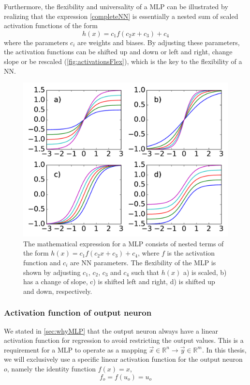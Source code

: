 \documentclass[twoside,english]{uiofysmaster}
\begin{document}
Furthermore, the flexibility and universality of a MLP can be illustrated by realizing that 
the expression \eqref{completeNN} is essentially a nested sum of scaled activation functions of the form
\begin{equation}
 h(x) = c_1 f(c_2 x + c_3) + c_4
\end{equation}
where the parameters $c_i$ are weights and biases. By adjusting these parameters, the activation functions
can be shifted up and down or left and right, change slope or be rescaled (\autoref{fig:activationsFlex}), 
which is the key to the flexibility of a NN. 
\begin{figure}
\begin{center}
  \includegraphics[width = 0.9\linewidth]{Figures/Theory/activationFlex.pdf}
  \caption{The mathematical expression for a MLP consists of nested terms of the form $h(x) = c_1 f(c_2 x + c_3) + c_4$, 
	   where $f$ is the activation function
	    and $c_i$ are NN parameters. The flexibility of the MLP is shown by adjusting $c_1$, $c_2$, $c_3$ and $c_4$ such that
	    $h(x)$
	    a) is scaled, b) has a change of slope, c) is shifted left and right, d) is shifted up and down, respectively.}
  \label{fig:activationsFlex}
  \end{center}
\end{figure}

\subsubsection{Activation function of output neuron}
We stated in \autoref{sec:whyMLP} that the output neuron always have a linear activation function for regression to avoid
restricting the output values. This is a requirement for a MLP to operate as a mapping 
$\vec{x} \in \mathbb{R}^n \rightarrow \vec{y} \in \mathbb{R}^m$. In this thesis, we will exclusively use a
specific linear activation function for the output neuron $o$, namely the identity function $f(x) = x$,
\begin{equation}
 f_o = f(u_o) = u_o
 \label{outputActivation}
\end{equation}
\end{document}
